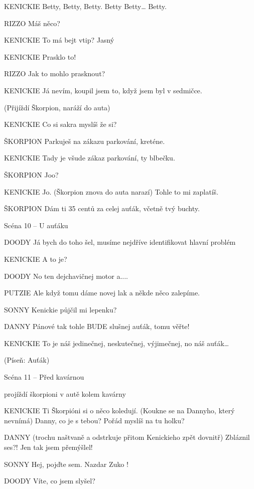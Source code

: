 KENICKIE        Betty, Betty, Betty. Betty Betty… Betty.

RIZZO        Máš něco?

KENICKIE        To má bejt vtip? Jasný

KENICKIE        Prasklo to!

RIZZO        Jak to mohlo prasknout?

KENICKIE        Já nevím, koupil jsem to, když jsem byl v sedmičce.

(Přijíždí Škorpion, naráží do auta)

KENICKIE        Co si sakra myslíš že si?

ŠKORPION        Parkuješ na zákazu parkování, kreténe.

KENICKIE        Tady je všude zákaz parkování, ty blbečku.

ŠKORPION        Joo?

KENICKIE        Jo. (Škorpion znova do auta narazí) Tohle to mi zaplatíš.

ŠKORPION        Dám ti 35 centů za celej auťák, včetně tvý buchty.

Scéna 10 – U auťáku

DOODY        Já bych do toho šel, musíme nejdříve identifikovat hlavní problém

KENICKIE        A to je?

DOODY        No ten dejchavičnej motor a.... 

PUTZIE         Ale když tomu dáme novej lak a někde něco zalepíme. 

SONNY        Kenickie půjčil mi lepenku? 

DANNY         Pánové tak tohle BUDE  slušnej auťák, tomu věřte!

KENICKIE        To je náš jedinečnej, neskutečnej, výjimečnej, no náš auťák…

                 (Píseň: Auťák) 

Scéna 11 – Před kavárnou 

projíždí škorpioni v autě kolem kavárny 

KENICKIE         Ti Škorpióni si o něco koledují. (Koukne se na Dannyho, který nevnímá)                 Danny, co je s tebou? Pořád myslíš na tu holku?

DANNY         (trochu naštvaně a odstrkuje přitom Kenickieho zpět dovnitř) Zbláznil         ses?! Jen tak jsem přemýšlel! 

SONNY         Hej, pojďte sem. Nazdar Zuko !  

DOODY         Víte, co jsem slyšel? 

